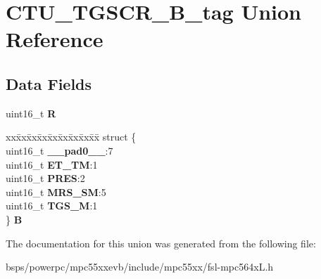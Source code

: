 \hypertarget{unionCTU__TGSCR__16B__tag}{}\section{C\+T\+U\+\_\+\+T\+G\+S\+C\+R\+\_\+B\+\_\+tag Union Reference}
\label{unionCTU__TGSCR__16B__tag}
\subsection*{Data Fields}
\begin{DoxyCompactItemize}
\item 
\mbox{\label{unionCTU__TGSCR__16B__tag_a3a9a10b54303afbb2dd794aaf91dc477}} 
uint16\+\_\+t {\bfseries R}
\item 
\mbox{\label{unionCTU__TGSCR__16B__tag_adac41dc8d302b48a6030c56dbd1aa882}} 
\begin{tabbing}
xx\=xx\=xx\=xx\=xx\=xx\=xx\=xx\=xx\=\kill
struct \{\\
\>uint16\_t {\bfseries \_\_pad0\_\_}:7\\
\>uint16\_t {\bfseries ET\_TM}:1\\
\>uint16\_t {\bfseries PRES}:2\\
\>uint16\_t {\bfseries MRS\_SM}:5\\
\>uint16\_t {\bfseries TGS\_M}:1\\
\} {\bfseries B}\\

\end{tabbing}\end{DoxyCompactItemize}


The documentation for this union was generated from the following file\+:\begin{DoxyCompactItemize}
\item 
bsps/powerpc/mpc55xxevb/include/mpc55xx/fsl-\/mpc564x\+L.\+h\end{DoxyCompactItemize}
